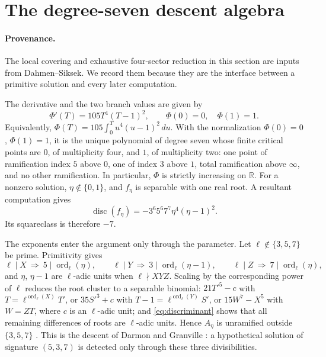 \documentclass[11pt]{article}
\newcommand{\ord}{\operatorname{ord}}
\newcommand{\disc}{\operatorname{disc}}
\theoremstyle{definition}
\theoremstyle{remark}
\begin{document}
\section{The degree-seven descent algebra}\label{sec:descent}

\paragraph{Provenance.}
The local covering and exhaustive four-sector reduction in this section are
inputs from Dahmen--Siksek.  We record them because they are the
interface between a primitive solution and every later computation.

The derivative and the two branch values are given by
\begin{equation}\label{eq:derivative}
          \Phi'(T)=105T^4(T-1)^2,
          \qquad \Phi(0)=0,\quad \Phi(1)=1.
\end{equation}
Equivalently, $\Phi(T)=105\int_0^T u^4(u-1)^2\,du$.  With the
normalization $\Phi(0)=0$, $\Phi(1)=1$, it is the unique polynomial of
degree seven whose finite critical points are $0$, of multiplicity four,
and $1$, of multiplicity two: one point of ramification index $5$ above
$0$, one of index $3$ above $1$, total ramification above $\infty$, and
no other ramification.
In particular, $\Phi$ is strictly increasing on $\mathbb R$.  For a
nonzero solution, $\eta\notin\{0,1\}$, and $f_\eta$ is separable with one
real root.  A resultant computation gives
\begin{equation}\label{eq:discriminant}
 \disc(f_\eta)
   =-3^6 5^6 7^7\eta^4(\eta-1)^2.
\end{equation}
Its squareclass is therefore $-7$.

The exponents enter the argument only through the parameter.  Let
$\ell\notin\{3,5,7\}$ be prime.  Primitivity gives
\[
 \ell\mid X\ \Rightarrow\ 5\mid\ord_\ell(\eta),\qquad
 \ell\mid Y\ \Rightarrow\ 3\mid\ord_\ell(\eta-1),\qquad
 \ell\mid Z\ \Rightarrow\ 7\mid\ord_\ell(\eta),
\]
and $\eta$, $\eta-1$ are $\ell$-adic units when $\ell\nmid XYZ$.  Scaling
by the corresponding power of $\ell$ reduces the root cluster to a separable
binomial: $21T'^5-c$ with $T=\ell^{\ord_\ell(X)}T'$, or $35S'^3+c$ with
$T-1=\ell^{\ord_\ell(Y)}S'$, or $15W^7-X^5$ with $W=ZT$, where $c$ is an
$\ell$-adic unit; and \eqref{eq:discriminant} shows that all remaining
differences of roots are $\ell$-adic units.  Hence $A_\eta$ is unramified
outside $\{3,5,7\}$ \cite[Lemma~4.1(ii)]{DahmenSiksek}.  This is the
descent of Darmon and Granville \cite{DarmonGranville}: a hypothetical
solution of signature $(5,3,7)$ is detected only through these three
divisibilities.
\end{document}
